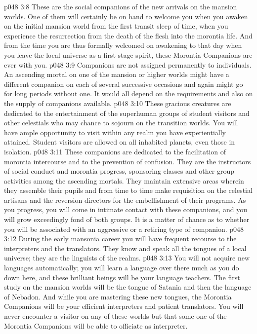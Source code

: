 \vs p048 3:8 \bibnobreakspace {} These are the social companions of the new arrivals on the mansion worlds. One of them will certainly be on hand to welcome you when you awaken on the initial mansion world from the first transit sleep of time, when you experience the resurrection from the death of the flesh into the morontia life. And from the time you are thus formally welcomed on awakening to that day when you leave the local universe as a first\hyp{}stage spirit, these Morontia Companions are ever with you.
\vs p048 3:9 Companions are not assigned permanently to individuals. An ascending mortal on one of the mansion or higher worlds might have a different companion on each of several successive occasions and again might go for long periods without one. It would all depend on the requirements and also on the supply of companions available.
\vs p048 3:10 \bibnobreakspace {} These gracious creatures are dedicated to the entertainment of the superhuman groups of student visitors and other celestials who may chance to sojourn on the transition worlds. You will have ample opportunity to visit within any realm you have experientially attained. Student visitors are allowed on all inhabited planets, even those in isolation.
\vs p048 3:11 \bibnobreakspace {} These companions are dedicated to the facilitation of morontia intercourse and to the prevention of confusion. They are the instructors of social conduct and morontia progress, sponsoring classes and other group activities among the ascending mortals. They maintain extensive areas wherein they assemble their pupils and from time to time make requisition on the celestial artisans and the reversion directors for the embellishment of their programs. As you progress, you will come in intimate contact with these companions, and you will grow exceedingly fond of both groups. It is a matter of chance as to whether you will be associated with an aggressive or a retiring type of companion.
\vs p048 3:12 \bibnobreakspace {} During the early mansonia career you will have frequent recourse to the interpreters and the translators. They know and speak all the tongues of a local universe; they are the linguists of the realms.
\vs p048 3:13 You will not acquire new languages automatically; you will learn a language over there much as you do down here, and these brilliant beings will be your language teachers. The first study on the mansion worlds will be the tongue of Satania and then the language of Nebadon. And while you are mastering these new tongues, the Morontia Companions will be your efficient interpreters and patient translators. You will never encounter a visitor on any of these worlds but that some one of the Morontia Companions will be able to officiate as interpreter.

